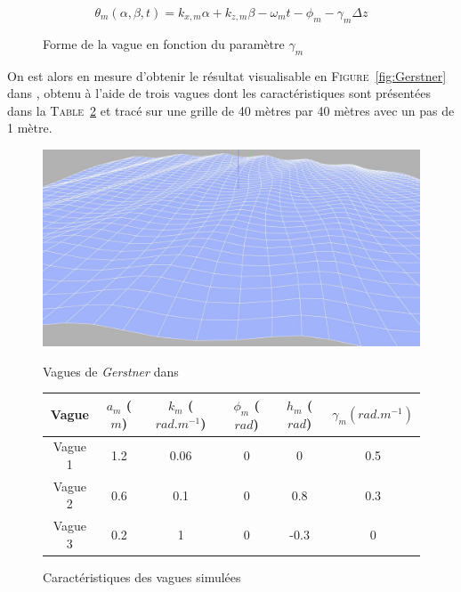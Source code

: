 				\begin{equation}
					\theta_m(\alpha, \beta, t) = k_{x, m} \alpha + k_{z, m} \beta - \omega_m t - \phi_m - \gamma_m \Delta z
					\label{equation:pixar_phase}
				\end{equation}

				\begin{figure}
					\centering
					\caption{Forme de la vague en fonction du paramètre $\gamma_m$}
					\label{fig:gerstner_pixar}
				\end{figure}

				On est alors en mesure d'obtenir le résultat visualisable en \textsc{Figure}~\ref{fig:Gerstner} dans \gazebo{}, obtenu à l'aide de trois vagues dont les caractéristiques sont présentées dans la \textsc{Table}~\ref{table:wave} et tracé sur une grille de 40 mètres par 40 mètres avec un pas de 1 mètre.

				\begin{figure}[!htb]
					\begin{minipage}[c]{0.4\textwidth}
						\centering
						\includegraphics[width=\textwidth]{imgs/gerstner.jpg}
						\caption{Vagues de \textit{Gerstner} dans \gazebo{}}
						\label{fig:Gerstner}
					\end{minipage} \hfill
					\begin{minipage}[c]{0.58\textwidth}
						\begin{adjustbox}{max width=\textwidth}
							\begin{tabular}{c c c c c c}
								\toprule
								\textbf{Vague} & $a_m$ ($m$) & $k_m$ ($rad.m^{-1}$) & $\phi_m$ ($rad$) & $h_m$ ($rad$) & $\gamma_m (rad.m^{-1})$ \\
								\midrule
								Vague 1 & 1.2 & 0.06 & 0 & 0 & 0.5\\
								Vague 2 & 0.6 & 0.1 & 0 & 0.8 & 0.3\\
								Vague 3 & 0.2 & 1 & 0 & -0.3 & 0\\
								\bottomrule
							\end{tabular}
						\end{adjustbox}
						\caption{Caractéristiques des vagues simulées}
						\label{table:wave}
					\end{minipage}
				\end{figure}

